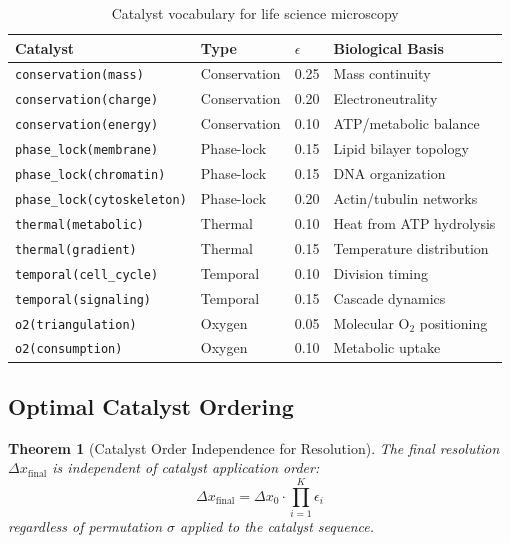 \documentclass[11pt,a4paper]{article}
\newtheorem{theorem}{Theorem}[section]
\theoremstyle{definition}
\theoremstyle{remark}
\begin{document}
\begin{table}[H]
\centering
\caption{Catalyst vocabulary for life science microscopy}
\label{tab:catalysts}
\begin{tabular}{@{}llll@{}}
\toprule
Catalyst & Type & $\epsilon$ & Biological Basis \\
\midrule
\texttt{conservation(mass)} & Conservation & 0.25 & Mass continuity \\
\texttt{conservation(charge)} & Conservation & 0.20 & Electroneutrality \\
\texttt{conservation(energy)} & Conservation & 0.10 & ATP/metabolic balance \\
\texttt{phase\_lock(membrane)} & Phase-lock & 0.15 & Lipid bilayer topology \\
\texttt{phase\_lock(chromatin)} & Phase-lock & 0.15 & DNA organization \\
\texttt{phase\_lock(cytoskeleton)} & Phase-lock & 0.20 & Actin/tubulin networks \\
\texttt{thermal(metabolic)} & Thermal & 0.10 & Heat from ATP hydrolysis \\
\texttt{thermal(gradient)} & Thermal & 0.15 & Temperature distribution \\
\texttt{temporal(cell\_cycle)} & Temporal & 0.10 & Division timing \\
\texttt{temporal(signaling)} & Temporal & 0.15 & Cascade dynamics \\
\texttt{o2(triangulation)} & Oxygen & 0.05 & Molecular O$_2$ positioning \\
\texttt{o2(consumption)} & Oxygen & 0.10 & Metabolic uptake \\
\bottomrule
\end{tabular}
\end{table}

\subsection{Optimal Catalyst Ordering}

\begin{theorem}[Catalyst Order Independence for Resolution]
\label{thm:order_independence}
The final resolution $\Delta x_{\mathrm{final}}$ is independent of catalyst application order:
\begin{equation}
\Delta x_{\mathrm{final}} = \Delta x_0 \cdot \prod_{i=1}^{K} \epsilon_i
\end{equation}
regardless of permutation $\sigma$ applied to the catalyst sequence.
\end{theorem}
\end{document}
